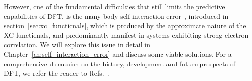 {
However, one of the fundamental difficulties
that still limits the predictive capabilities of DFT, 
is the many-body self-interaction error~\cite{PhysRevB.57.1505,cohen2008insights,PhysRevB.23.5048}, 
introduced in section~\ref{sec:xc_functionals}, 
which is 
produced by the approximate nature of 
the XC functionals,  
and predominantly manifest 
in systems exhibiting 
strong electron correlation. 
%
We will explore this issue in detail 
in Chapter~\ref{ch:self_interaction_error} 
and discuss {some viable} solutions.
%
For a comprehensive discussion 
on the history, development 
and future prospects of DFT, 
we refer the reader to 
Refs.~\cite{CAPELLE2006,doi:10.1063/1.4704546,RevModPhys.87.897,cohen2008insights}.}


